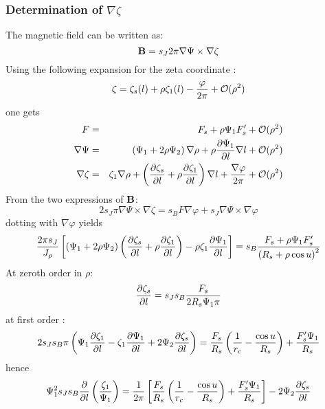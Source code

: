 \subsubsection{Determination of $\nabla \zeta$}
The magnetic field can be written as:
\begin{equation}
{\bf B} = s_J 2 \pi \nabla \Psi \times \nabla \zeta
\end{equation}
Using the following expansion for the zeta coordinate \cite{CAN09}:
\begin{equation}
\zeta = \zeta_s (l) + \rho \zeta_1 (l) - {\varphi \over 2 \pi} + \mathcal{O}(\rho^2)
\end{equation}
one gets
\begin{eqnarray}
F &=& F_s + \rho \Psi_1 F_s' + \mathcal{O}(\rho^2) \\
\nabla \Psi &=& \left(\Psi_1 + 2 \rho \Psi_2 \right) \nabla \rho + \rho \frac{\partial  \Psi_1}{\partial l} \nabla l + \mathcal{O}(\rho^2) \\
\nabla \zeta &=& \zeta_1 \nabla \rho + \left(\frac{\partial  \zeta_s}{\partial l} + \rho \frac{\partial  \zeta_1}{\partial l} \right) \nabla l + {\nabla \varphi \over 2 \pi} + \mathcal{O}(\rho^2)
\end{eqnarray}
From the two expressions of ${\bf B}$:
\begin{equation}
2 s_J \pi \nabla \Psi \times \nabla \zeta = s_B F \nabla \varphi + s_J \nabla \Psi \times \nabla \varphi
\end{equation}
dotting with $\nabla \varphi$ yields
\begin{equation}
{2 \pi s_J \over J_\rho} \left[(\Psi_1 + 2 \rho \Psi_2)\left(\frac{\partial  \zeta_s}{\partial l} + \rho \frac{\partial  \zeta_1}{\partial l} \right) - \rho \zeta_1 \frac{\partial  \Psi_1}{\partial l} \right] = s_B {F_s + \rho \Psi_1 F_s' \over \left(R_s + \rho \cos u \right)^2}
\end{equation}
At zeroth order in $\rho$:
\begin{equation}
\frac{\partial  \zeta_s}{\partial l} = s_J s_B {F_s \over 2 R_s \Psi_1 \pi}
\end{equation}
at first order :
\begin{equation}
2 s_J s_B \pi \left(\Psi_1 \frac{\partial  \zeta_1}{\partial l} - \zeta_1 \frac{\partial  \Psi_1}{\partial l} + 2 \Psi_2 \frac{\partial  \zeta_s}{\partial l}\right) = {F_s \over R_s} \left({1 \over r_c} - {\cos u \over R_s} \right) + {F_s' \Psi_1 \over R_s}
\end{equation}
hence
\begin{equation}
\Psi_1^2 s_J s_B \frac{\partial }{\partial l} \left({\zeta_1 \over \Psi_1} \right) = {1 \over 2 \pi} \left[{F_s \over R_s} \left({1 \over r_c} - {\cos u \over R_s} \right) + {F_s' \Psi_1 \over R_s} \right] - 2 \Psi_2 \frac{\partial  \zeta_s}{\partial l}
\end{equation}
